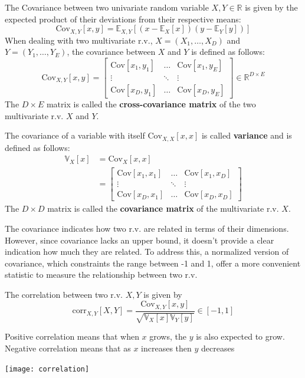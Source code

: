 \documentclass{article}
\begin{document}
\begin{definition}[Covariance]
    The Covariance between two univariate random variable $X,Y\in \mathbb{R}$
    is given by the expected product of their deviations from their respective
    means:
    $$\text{Cov}_{X,Y}[x,y]=\mathbb{E}_{X,Y}[(x-\mathbb{E}_X[x])(y-\mathbb{E}_Y[y])]$$
    When dealing with two multivariate r.v., $X=(X_1,\ldots,X_D)$ and
    $Y=(Y_1,\ldots,Y_E)$, the covariance between $X$ and $Y$ is defined as
    follows: 
    $$\text{Cov}_{X,Y}[x,y]=\begin{bmatrix}
        \text{Cov}[x_1,y_1] & \ldots &
        \text{Cov}[x_1,y_E] \\ 
        \vdots & \ddots & \vdots \\ 
        \text{Cov}[x_D,y_1] & \ldots & \text{Cov}[x_D,y_E]
    \end{bmatrix}\in \mathbb{R}^{D\times E}$$
    The $D\times E$ matrix is called the \textbf{cross-covariance matrix} of
    the two multivariate r.v. $X$ and $Y$.
\end{definition}
\begin{definition}[Variance]The covariance of a variable with itself $\text{Cov}_{X,X}[x,x]$ is called
    \textbf{variance} and is defined as follows:
    $$
        \begin{aligned}
            \mathbb{V}_X[x]&=\text{Cov}_X[x,x]\\
                           &=\begin{bmatrix}
                               \text{Cov}[x_1,x_1] & \ldots &
                               \text{Cov}[x_1,x_D] \\ 
                               \vdots & \ddots & \vdots \\ 
                               \text{Cov}[x_D,x_1] & \ldots & \text{Cov}[x_D,x_D]
                           \end{bmatrix}
        \end{aligned}
    $$
    The $D\times D$ matrix is called the \textbf{covariance matrix} of the
    multivariate r.v. $X$.
\end{definition}
The covariance indicates how two r.v. are related in terms of their
dimensions. However, since covariance lacks an upper bound, it doesn't provide
a clear indication how much they are related. To address this, a normalized
version of covariance, which constraints the range between -1 and 1, offer a
more convenient statistic to measure the relationship between two r.v.
\begin{definition}[Correlation]
    The correlation between two r.v. $X,Y$ is given by
    $$\text{corr}_{X,Y}[X,Y]=\frac{\text{Cov}_{X,Y}[x,y]}{\sqrt{\mathbb{V}_X[x]\mathbb{V}_Y[y]}}\in[-1,1]$$
\end{definition}
Positive correlation means that when $x$ grows, the $y$ is also expected to
grow. Negative correlation means that as $x$ increases then $y$ decreases
\begin{center}
    \texttt{[image: correlation]}
\end{center}
\end{document}
